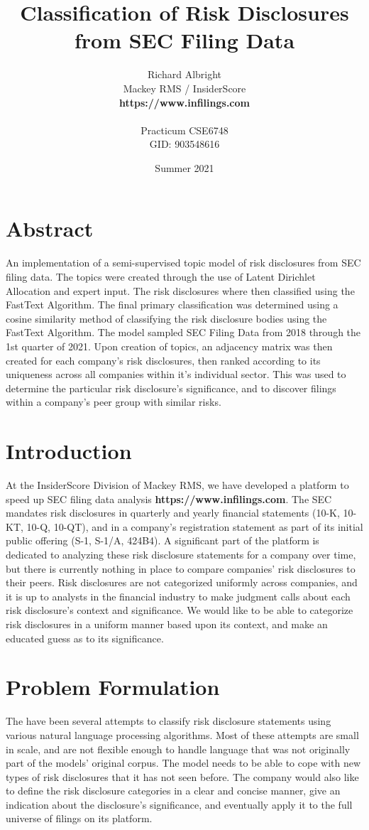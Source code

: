 \documentclass[11pt]{article}
\title{\textbf{Classification of Risk Disclosures from SEC Filing Data}}
\author{Richard Albright \\
    	Mackey RMS / InsiderScore \\
    	{\textbf{https://www.infilings.com}} \\
    	\\
    	Practicum CSE6748 \\
    	GID: 903548616}
\date{Summer 2021}
\begin{document}
\maketitle
\thispagestyle{empty}

\section{Abstract}
An implementation of a semi-supervised topic model of risk disclosures from SEC filing data.  The topics were created through the use of Latent Dirichlet Allocation and expert input.  The risk disclosures where then classified using the FastText Algorithm.  The final primary classification was determined using a cosine similarity method of classifying the risk disclosure bodies using the FastText Algorithm.  The model sampled SEC Filing Data from 2018 through the 1st quarter of 2021.  Upon creation of topics, an adjacency matrix was then created for each company's risk disclosures, then ranked according to its uniqueness across all companies within it's individual sector.  This was used to determine the particular risk disclosure's significance, and to discover filings within a company's peer group with similar risks.

\section{Introduction}
At the InsiderScore Division of Mackey RMS, we have developed a platform to speed up SEC filing data analysis \textbf{https://www.infilings.com}. The SEC mandates risk disclosures in quarterly and yearly financial statements (10-K, 10-KT, 10-Q, 10-QT), and in a company's registration statement as part of its initial public offering (S-1, S-1/A, 424B4).  A significant part of the platform is dedicated to analyzing these risk disclosure statements for a company over time, but there is currently nothing in place to compare companies' risk disclosures to their peers.  Risk disclosures are not categorized uniformly across companies, and it is up to analysts in the financial industry to make judgment calls about each risk disclosure's context and significance.  We would like to be able to categorize risk disclosures in a uniform manner based upon its context, and make an educated guess as to its significance.


\section{Problem Formulation}
The have been several attempts to classify risk disclosure statements using various natural language processing algorithms.  Most of these attempts are small in scale, and are not flexible enough to handle language that was not originally part of the models' original corpus. The model needs to be able to cope with new types of risk disclosures that it has not seen before. The company would also like to define the risk disclosure categories in a clear and concise manner, give an indication about the disclosure's significance, and eventually apply it to the full universe of filings on its platform.
\end{document}

